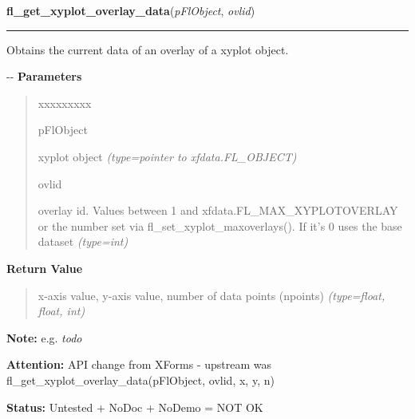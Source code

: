     \label{xformslib:flxyplot:fl_get_xyplot_overlay_data}

    \vspace{0.5ex}

\hspace{.8\funcindent}\begin{boxedminipage}{\funcwidth}

    \raggedright \textbf{fl\_get\_xyplot\_overlay\_data}(\textit{pFlObject}, \textit{ovlid})

    \vspace{-1.5ex}

    \rule{\textwidth}{0.5\fboxrule}
\setlength{\parskip}{2ex}

Obtains the current data of an overlay of a xyplot object.

-{}-
\setlength{\parskip}{1ex}
      \textbf{Parameters}
      \vspace{-1ex}

      \begin{quote}
        \begin{Ventry}{xxxxxxxxx}

          \item[pFlObject]


xyplot object
            {\it (type=pointer to xfdata.FL\_OBJECT)}

          \item[ovlid]


overlay id. Values between 1 and xfdata.FL\_MAX\_XYPLOTOVERLAY or the
number set via fl\_set\_xyplot\_maxoverlays(). If it's 0 uses the base
dataset
            {\it (type=int)}

        \end{Ventry}

      \end{quote}

      \textbf{Return Value}
    \vspace{-1ex}

      \begin{quote}

x-axis value, y-axis value, number of data points (npoints)
      {\it (type=float, float, int)}

      \end{quote}

\textbf{Note:} 
e.g. \emph{todo}


\textbf{Attention:} 
API change from XForms - upstream was
fl\_get\_xyplot\_overlay\_data(pFlObject, ovlid, x, y, n)


\textbf{Status:} 
Untested + NoDoc + NoDemo = NOT OK


    \end{boxedminipage}

